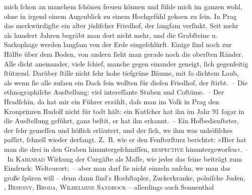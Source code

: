 \begin{ledgroupsized}[t]{13cm}
               mich ſchon an manchem ſchönen freuen können und fühle mich im ganzen wohl, ohne in
               irgend einem Augenblick zu einem Hochgefühl geko{\geminationm}en zu
               ſein. In Prag das merkwürdigſte ein alter jüdiſcher Friedhof, der
               langſam verſinkt. Seit mehr als hundert Jahren begräbt man dort nicht mehr, und die
               Grabſteine u. Sarkophage werden langſam von der Erde eingeſchlürft. Einige ſind noch
               zur Hälfte über dem Boden, von andern ſieht man gerade noch die oberſten Ränder. Alle
               dicht aneinander, viele ſchief, manche gegen einander geneigt, ſich gegenſeitig {\pb}ſtützend. Darüber ſtille nicht ſehr hohe tiefgrüne Bäume,
               mit ſo dichtem Laub, als wenn ſie alle zuſa{\geminationm}en ein Dach
               ſein wollten für dieſen Friedhof, der ſtirbt. – Die ethnographiſche
                  Ausſtellung: viel intereſſante Stuben und Coſtüme. – Der Hradſchin, da hat mir ein Führer erzählt, daſs man im Volk in
                  Prag den Kronprinzen Rudolf nicht für todt hält: ein Kutſcher hat ihn im Jahr
                  91{ }ſogar in die Ausſtellung geführt, ganz beſti{\geminationm}t, er hat ihn erkannt. – Ein Hofbedienſteter, der ſehr
               gemeſſen und höflich erläutert, und der ſich, we{\geminationn} ihm
               was unhöfiſches paſſirt, ſchnell wieder derfangt. Z. B. {\pb}wie er den Fenſterſturz berichtet: »Hier hat man die drei in den Graben
               hinuntergeſchmiſſen, \textsc{reſpective} hinuntergeworfen«.\pend
           \pstart
           – In \textsc{Karlsbad} Wirkung der Curgäſte als Maſſe, wie jeder das ſeine beiträgt zum Eindruck:
               Weltcurort; – aber man darf ſie nicht einzeln anſehn, we{\geminationn} man das große ſpüren will – denn dann ſind’s Hochſtapler, Zuckerkranke, polniſche Juden, \label{K_L00462-1v}\label{K_L00462-1h}, \textsc{Besesny}, \textsc{Broda}, \textsc{Wilhelmine Sandrock} – allerdings auch Sonnenthal

\end{ledgroupsized}
